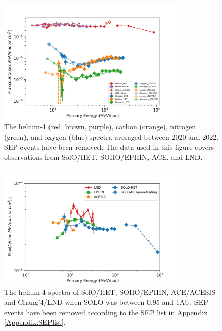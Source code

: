 \begin{figure}[!htb]
    \centering
    \includegraphics[width = 0.8\textwidth]{images/ACR/ACE_SIS_CRIS_SOLO_all_3.png}
    \caption[The quiet time spectra of helium, carbon, nitrogen, and oxygen between 2020 and 2022]{The helium-4 (red, brown, purple), carbon (orange), nitrogen (green), and oxygen (blue) spectra averaged between 2020 and 2022. \ac{SEP} events have been removed. The data used in this figure covers observations from \ac{SolO}/\ac{HET}, \ac{SOHO}/\ac{EPHIN}, \ac{ACE}, and \ac{LND}.}
    \label{fig:overview}
\end{figure}
\begin{figure}[!htb]
    \centering
    \includegraphics[width = 0.8\textwidth]{images/ACR/1AU_comparison_ACE_EPHIN_SOLO_SEP_version2.png}
    \caption[The helium spectra when \ac{SolO} was between 0.95 and 1 au]{The helium-4 spectra of \ac{SolO}/\ac{HET}, \ac{SOHO}/\ac{EPHIN}, \ac{ACE}/\ac{ACESIS} and Chang'4/\ac{LND} when SOLO was between 0.95 and 1AU. \ac{SEP} events have been removed according to the \ac{SEP} list in Appendix \ref{Appendix:SEPlist}.}
    \label{fig:helium_spec_1au}
\end{figure}

